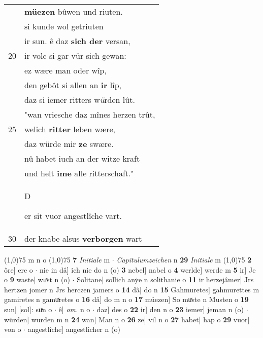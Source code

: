 \documentclass[8pt,a4paper,notitlepage]{article}
\begin{document}
\begin{table}[ht]
\begin{minipage}[t]{0.5\linewidth}
\begin{tabular}{rl}
 & \textbf{müezen} bûwen und riuten.\\ 
 & si kunde wol getriuten\\ 
 & ir sun. ê daz \textbf{sich der} versan,\\ 
20 & ir volc si gar vür sich gewan:\\ 
 & ez wære man oder wîp,\\ 
 & den gebôt si allen an \textbf{ir} lîp,\\ 
 & daz si iemer ritters w\textit{ü}rden lût.\\ 
 & "wan vriesche daz mînes herzen trût,\\ 
25 & welich \textbf{ritter} leben wære,\\ 
 & daz würde mir \textbf{ze} swære.\\ 
 & nû habet iuch an der witze kraft\\ 
 & und helt \textbf{ime} alle ritterschaft."\\ 
 & \begin{large}D\end{large}er sit vuor angestlîche vart.\\ 
30 & der knabe alsus \textbf{verborgen} wart\\ 
\end{tabular}
\scriptsize
\line(1,0){75} \newline
m n o \newline
\line(1,0){75} \newline
\textbf{7} \textit{Initiale} m   $\cdot$ \textit{Capitulumzeichen} n  \textbf{29} \textit{Initiale} m  \newline
\line(1,0){75} \newline
\textbf{2} ôre] ere o  $\cdot$ nie in dâ] ich nie do n (o) \textbf{3} nebel] nabel o \textbf{4} werlde] werde m \textbf{5} ir] Je o \textbf{9} waste] wuͯst n (o)  $\cdot$ Solitane] sollich anẏe n solithanie o \textbf{11} ir herzejâmer] Jrs hertzen jomer n Jrs herczen jamers o \textbf{14} dâ] do n \textbf{15} Gahmuretes] gahmurettes m gamiretes n gamuͯretes o \textbf{16} dâ] do m n o \textbf{17} müezen] So muͯste n Musten o \textbf{19} sun] [sol]: suͯn o  $\cdot$ ê] \textit{om.} n o  $\cdot$ daz] des o \textbf{22} ir] den n o \textbf{23} iemer] jeman n (o)  $\cdot$ würden] wurden m n \textbf{24} wan] Man n o \textbf{26} ze] vil n o \textbf{27} habet] hap o \textbf{29} vuor] von o  $\cdot$ angestlîche] angestlicher n (o) \newline
\end{minipage}
\end{table}
\newpage
\end{document}

